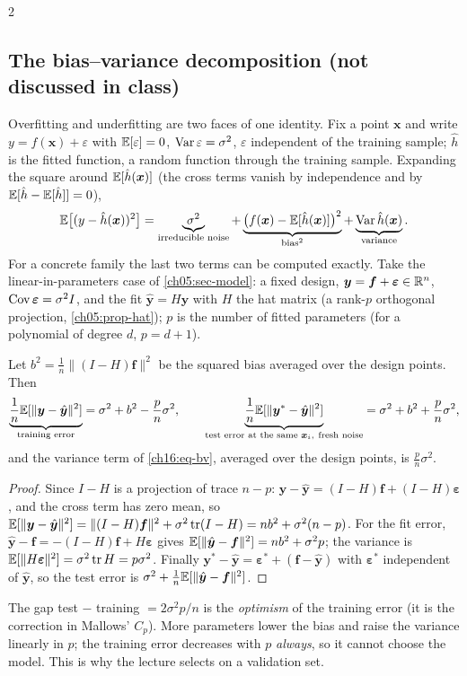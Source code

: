 \begin{paracol}{2}
\subsection{The bias--variance decomposition (not discussed in class)}
Overfitting and underfitting are two faces of one identity. Fix a point $\bm x$ and write $y=f(\bm x)+\varepsilon$ with
$\mathbb{E}[\varepsilon]=0$, $\operatorname{Var}\varepsilon=\sigma^2$, $\varepsilon$ independent of the training sample; $\hat h$ is the
fitted function, a random function through the training sample. Expanding the square around $\mathbb{E}[\hat h(\bm x)]$ (the cross terms vanish by
independence and by $\mathbb{E}[\hat h-\mathbb{E}[\hat h]]=0$),
\begin{equation}\label{ch16:eq-bv}
  \mathbb{E}\bigl[(y-\hat h(\bm x))^2\bigr]=\underbrace{\sigma^2}_{\text{irreducible noise}}
  +\underbrace{\bigl(f(\bm x)-\mathbb{E}[\hat h(\bm x)]\bigr)^2}_{\text{bias}^2}
  +\underbrace{\operatorname{Var}\hat h(\bm x)}_{\text{variance}} .
\end{equation}
For a concrete family the last two terms can be computed exactly. Take the linear-in-parameters case of
\cref{ch05:sec-model}: a fixed design, $\bm y=\bm f+\bm\varepsilon\in\mathbb{R}^n$, $\operatorname{Cov}\bm\varepsilon=\sigma^2I$, and the fit
$\hat{\bm y}=H\bm y$ with $H$ the hat matrix (a rank-$p$ orthogonal projection, \cref{ch05:prop-hat}); $p$ is the number of
fitted parameters (for a polynomial of degree $d$, $p=d+1$).

\begin{proposition}\label{ch16:prop-bv}
Let $b^2=\frac1n\|(I-H)\bm f\|^2$ be the squared bias averaged over the design points. Then
\[
  \underbrace{\frac1n\mathbb{E}[\|\bm y-\hat{\bm y}\|^2]}_{\text{training error}}=\sigma^2+b^2-\frac{p}{n}\sigma^2,\qquad
  \underbrace{\frac1n\mathbb{E}[\|\bm y^*-\hat{\bm y}\|^2]}_{\text{test error at the same }\bm x_i,\ \text{fresh noise}}=\sigma^2+b^2+\frac{p}{n}\sigma^2 ,
\]
and the variance term of \eqref{ch16:eq-bv}, averaged over the design points, is $\frac pn\sigma^2$.
\end{proposition}
\begin{proof}
Since $I-H$ is a projection of trace $n-p$: $\bm y-\hat{\bm y}=(I-H)\bm f+(I-H)\bm\varepsilon$, and the cross term has zero mean, so
$\mathbb{E}[\|\bm y-\hat{\bm y}\|^2]=\|(I-H)\bm f\|^2+\sigma^2\operatorname{tr}(I-H)=nb^2+\sigma^2(n-p)$. For the fit error,
$\hat{\bm y}-\bm f=-(I-H)\bm f+H\bm\varepsilon$ gives $\mathbb{E}[\|\hat{\bm y}-\bm f\|^2]=nb^2+\sigma^2p$; the variance is
$\mathbb{E}[\|H\bm\varepsilon\|^2]=\sigma^2\operatorname{tr} H=p\sigma^2$. Finally $\bm y^*-\hat{\bm y}=\bm\varepsilon^*+(\bm f-\hat{\bm y})$ with
$\bm\varepsilon^*$ independent of $\hat{\bm y}$, so the test error is $\sigma^2+\frac1n\mathbb{E}[\|\hat{\bm y}-\bm f\|^2]$.
\end{proof}
The gap test $-$ training $=2\sigma^2p/n$ is the \emph{optimism} of the training error (it is the correction in Mallows' $C_p$).
More parameters lower the bias and raise the variance linearly in $p$; the training error decreases with $p$
\emph{always}, so it cannot choose the model. This is why the lecture selects on a validation set.


\end{paracol}
